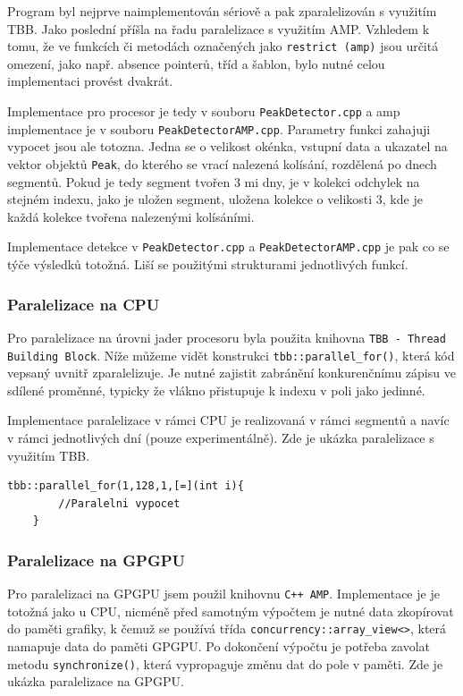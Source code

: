 \documentclass{article}
\begin{document}
	Program byl nejprve naimplementován sériově a pak zparalelizován s využitím TBB. Jako poslední příšla na řadu paralelizace s využitím AMP. Vzhledem k tomu, že ve funkcích či metodách označených jako \texttt{restrict (amp)} jsou určitá omezení, jako např. absence pointerů, tříd a šablon, bylo nutné celou implementaci provést dvakrát.
	
	Implementace pro procesor je tedy v souboru \texttt{PeakDetector.cpp} a amp implementace je v souboru \texttt{PeakDetectorAMP.cpp}. Parametry funkci zahajuji vypocet jsou ale totozna. Jedna se o velikost okénka, vstupní data a ukazatel na vektor objektů \texttt{Peak}, do kterého se vrací nalezená kolísání, rozdělená po dnech segmentů. Pokud je tedy segment tvořen 3 mi dny, je v kolekci odchylek na stejném indexu, jako je uložen segment, uložena kolekce o velikosti 3, kde je každá kolekce tvořena nalezenými kolísáními.
	
	Implementace detekce v \texttt{PeakDetector.cpp} a  \texttt{PeakDetectorAMP.cpp} je pak co se týče výsledků totožná. Liší se použitými strukturami jednotlivých funkcí.
	
	\subsubsection{Paralelizace na CPU}
	
	Pro paralelizace na úrovni jader procesoru byla použita knihovna \texttt{TBB - Thread Building Block}. 
	Níže můžeme vidět konstrukci \texttt{tbb::parallel\_for()}, která kód vepsaný uvnitř zparalelizuje. Je nutné zajistit zabránění konkurenčnímu zápisu ve sdílené proměnné, typicky že vlákno přistupuje k indexu v poli jako jedinné.
	
	Implementace paralelizace v rámci CPU je realizovaná v rámci segmentů a navíc v rámci jednotlivých dní (pouze experimentálně). 
	Zde je ukázka paralelizace s využitím TBB.
	\vspace{0.4cm}
	\noindent
	\begin{minipage}{\linewidth}
	\begin{lstlisting}[label={lst:parallelFor}]
	tbb::parallel_for(1,128,1,[=](int i){
		//Paralelni vypocet
	}
	\end{lstlisting} 
	\end{minipage}
	
	\subsubsection{Paralelizace na GPGPU}
	Pro paralelizaci na GPGPU jsem použil knihovnu \texttt{C++ AMP}. 
	Implementace je je totožná jako u CPU, nicméně před samotným výpočtem je nutné data zkopírovat do paměti grafiky, k čemuž se používá třída \texttt{concurrency::array\_view<>}, která namapuje data do paměti GPGPU. 
	Po dokončení výpočtu je potřeba zavolat metodu \texttt{synchronize()}, která vypropaguje změnu dat do pole v paměti.
	Zde je ukázka paralelizace na GPGPU. 
	
\end{document}
